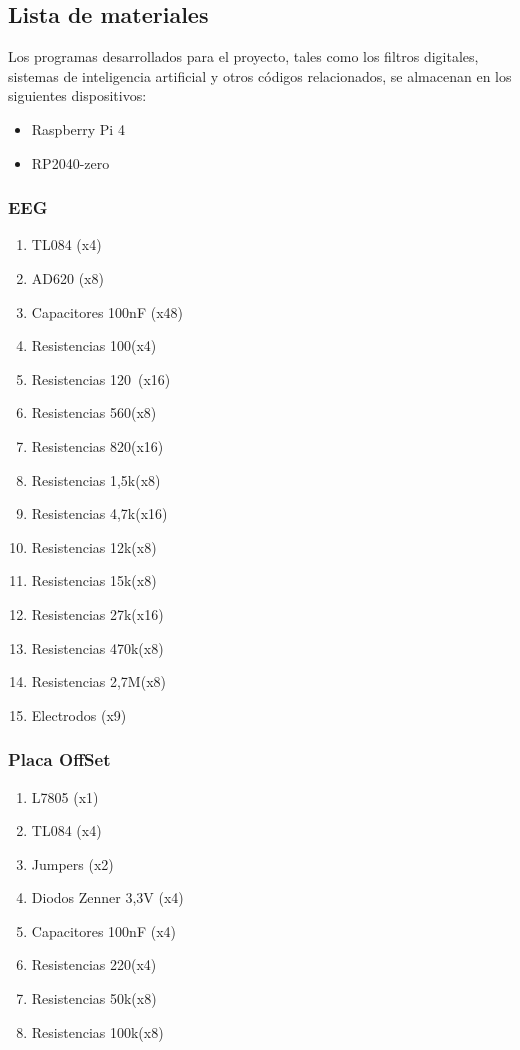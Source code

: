 \documentclass{article}
\begin{document}
\subsection{Lista de materiales}
Los programas desarrollados para el proyecto, tales como los filtros digitales, sistemas de inteligencia artificial y otros códigos relacionados, se almacenan en los siguientes dispositivos:

\begin{itemize}
    \item Raspberry Pi 4
    \item RP2040-zero
\end{itemize}

\subsubsection{EEG}
\begin{enumerate}
    \item TL084 (x4)
    \item AD620 (x8)
    \item Capacitores 100nF (x48)
    \item Resistencias 100\omega (x4)
    \item Resistencias 120\ (x16)
    \item Resistencias 560\Ω (x8) 
    \item Resistencias 820\Ω (x16)
    \item Resistencias 1,5k\Ω (x8)
    \item Resistencias 4,7k\Ω (x16)
    \item Resistencias 12k\Ω (x8)
    \item Resistencias 15k\Ω (x8)
    \item Resistencias 27k\Ω (x16)
    \item Resistencias 470k\Ω (x8)
    \item Resistencias 2,7M\Ω (x8)
    \item Electrodos (x9)
\end{enumerate}

\subsubsection{Placa OffSet}
\begin{enumerate}
    \item L7805 (x1)
    \item TL084 (x4)
    \item Jumpers (x2)
    \item Diodos Zenner 3,3V (x4)
    \item Capacitores 100nF (x4)
    \item Resistencias 220\Ω (x4)
    \item Resistencias 50k\Ω (x8)
    \item Resistencias 100k\Ω (x8)
\end{enumerate}
\end{document}
